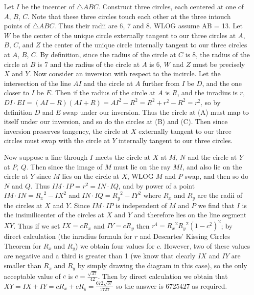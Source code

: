 \begin{solution}\hfil\medskip

	Let $I$ be the incenter of $\triangle ABC$. Construct three circles, each centered at one of $A$, $B$, $C$. Note that these three circles touch each other at the three intouch points of $\triangle ABC$. Thus their radii are 6, 7 and 8. WLOG assume AB = 13. Let $W$ be the center of the unique circle externally tangent to our three circles at $A$, $B$, $C$, and $Z$ the center of the unique circle internally tangent to our three circles at $A$, $B$, $C$. By definition, since the radius of the circle at $C$ is 8, the radius of the circle at $B$ is 7 and the radius of the circle at $A$ is 6, $W$ and $Z$ must be precisely $X$ and $Y$. Now consider an inversion with respect to the incircle. Let the intersection of the line $AI$ and the circle at $A$ further from $I$ be $D$, and the one closer to $I$ be $E$. Then if the radius of the circle at $A$ is $R$, and the inradius is $r$, $DI \cdot EI = (AI - R)(AI + R) = AI^2 - R^2 = R^2 + r^2 - R^2 = r^2$, so by definition $D$ and $E$ swap under our inversion. Thus the circle at (A) must map to itself under our inversion, and so do the circles at (B) and (C). Then since inversion preserves tangency, the circle at $X$ externally tangent to our three circles must swap with the circle at $Y$ internally tangent to our three circles. \medskip

	Now suppose a line through $I$ meets the circle at $X$ at $M$, $N$ and the circle at $Y$ at $P$, $Q$. Then since the image of $M$ must lie on the ray $MI$, and also lie on the circle at $Y$ since $M$ lies on the circle at $X$, WLOG $M$ and $P$ swap, and then so do $N$ and $Q$. Thus $IM \cdot IP = r^2 = IN \cdot IQ$, and by power of a point $IM \cdot IN = {R_x}^2 - IX^2$ and $IN \cdot IQ = {R_y}^2 - IY^2$ where $R_x$ and $R_y$ are the radii of the circles at $X$ and $Y$. Since $IM \cdot IP$ is independent of $M$ and $P$ we find that $I$ is the insimilicenter of the circles at $X$ and $Y$ and therefore lies on the line segment $XY$.
	Thus if we set $IX = cR_x$ and $IY = cR_y$ then $r^4 = {R_x}^2{R_y}^2(1 - c^2)^2$; by direct calculation (the inradius formula for $r$ and Descartes' Kissing Circles Theorem for $R_x$ and $R_y$) we obtain four values for $c$.
	However, two of these values are negative and a third is greater than 1 (we know that clearly $IX$ and $IY$ are smaller than $R_x$ and $R_y$ by simply drawing the diagram in this case), so the only acceptable value of $c$ is $c = \frac{\sqrt{37}}{42}$. Then by direct calculation we obtain that $XY = IX + IY = cR_x + cR_y = \frac{672\sqrt{37}}{1727}$ so the answer is $\boxed{6725427}$ as required.
\end{solution}\newpage

